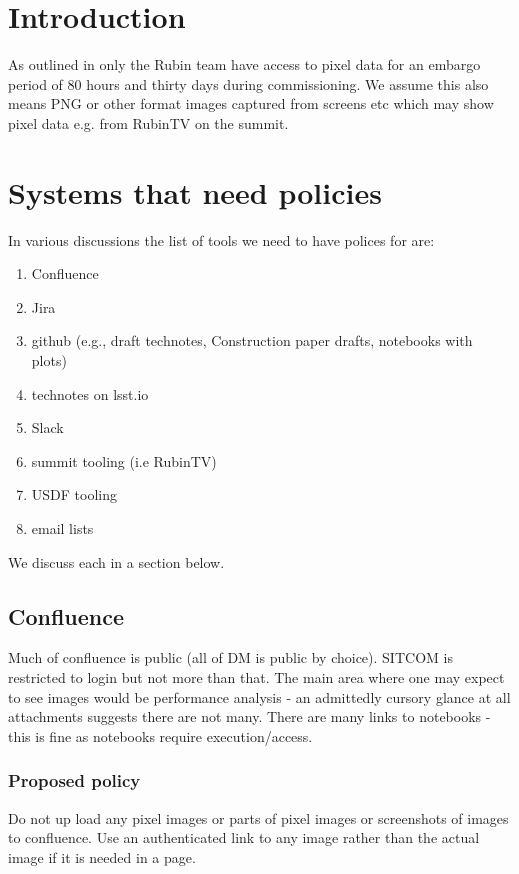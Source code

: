 
\section{Introduction}
As outlined in  only the Rubin team have access to pixel data for an embargo period of 80 hours and thirty days during commissioning. We assume this also means PNG or other format images captured from screens etc which may show pixel data e.g. from RubinTV on the summit.


\section {Systems that need policies}
In various discussions the list of tools we need to have polices for are:

\begin{enumerate}
    \item Confluence
    \item Jira
    \item github (e.g., draft technotes, Construction paper drafts, notebooks with plots)
    \item technotes on lsst.io
    \item Slack
    \item summit tooling (i.e RubinTV)
    \item USDF tooling
    \item email lists
\end{enumerate}

We discuss each in a section below.

\subsection{Confluence}
Much of confluence is public (all of DM is public by choice).
SITCOM is restricted to login but not more than that.
The main area where one may expect to see images would be performance analysis - an admittedly  cursory glance at all attachments suggests there are not many.
There are many links to notebooks - this is fine as notebooks require execution/access.

\subsubsection{Proposed policy}
Do not up load any pixel images or parts of pixel images or screenshots of images to confluence.
Use an authenticated link to any image rather than the actual image if it is needed in a page.



